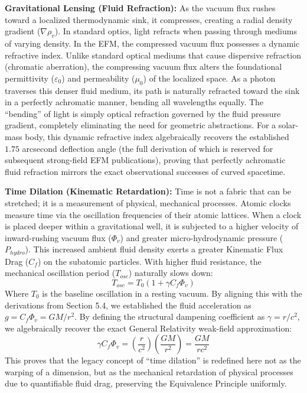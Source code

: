 \documentclass[11pt, a4paper]{article}
\begin{document}
  \textbf{Gravitational Lensing (Fluid Refraction):} As the vacuum flux rushes toward a localized thermodynamic sink, it compresses, creating a radial density gradient ($\nabla \rho_v$). In standard optics, light refracts when passing through mediums of varying density. In the EFM, the compressed vacuum flux possesses a dynamic refractive index. Unlike standard optical mediums that cause dispersive refraction (chromatic aberration), the compressing vacuum flux alters the foundational permittivity ($\varepsilon_0$) and permeability ($\mu_0$) of the localized space. As a photon traverses this denser fluid medium, its path is naturally refracted toward the sink in a perfectly achromatic manner, bending all wavelengths equally. The ``bending'' of light is simply optical refraction governed by the fluid pressure gradient, completely eliminating the need for geometric abstractions. For a solar-mass body, this dynamic refractive index algebraically recovers the established $1.75$ arcsecond deflection angle (the full derivation of which is reserved for subsequent strong-field EFM publications), proving that perfectly achromatic fluid refraction mirrors the exact observational successes of curved spacetime.

  \textbf{Time Dilation (Kinematic Retardation):} Time is not a fabric that can be stretched; it is a measurement of physical, mechanical processes. Atomic clocks measure time via the oscillation frequencies of their atomic lattices. When a clock is placed deeper within a gravitational well, it is subjected to a higher velocity of inward-rushing vacuum flux ($\Phi_v$) and greater micro-hydrodynamic pressure ($P_{hydro}$). This increased ambient fluid density exerts a greater Kinematic Flux Drag ($C_f$) on the subatomic particles. With higher fluid resistance, the mechanical oscillation period ($T_{osc}$) naturally slows down:
  \begin{equation}
    T_{osc} = T_0 (1 + \gamma C_f \Phi_v)
  \end{equation}
  Where $T_0$ is the baseline oscillation in a resting vacuum. By aligning this with the derivations from Section 5.4, we established the fluid acceleration as $g = C_f \Phi_v = GM/r^2$. By defining the structural dampening coefficient as $\gamma = r/c^2$, we algebraically recover the exact General Relativity weak-field approximation:
  \begin{equation}
    \gamma C_f \Phi_v = \left( \frac{r}{c^2} \right) \left( \frac{GM}{r^2} \right) = \frac{GM}{rc^2}
  \end{equation}
  This proves that the legacy concept of ``time dilation'' is redefined here not as the warping of a dimension, but as the mechanical retardation of physical processes due to quantifiable fluid drag, preserving the Equivalence Principle uniformly.
\end{document}
